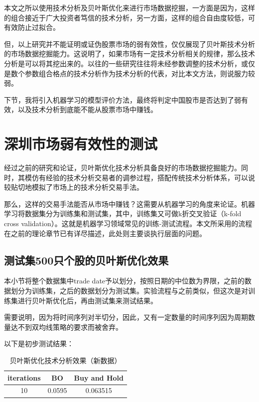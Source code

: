 \documentclass[twoside,longtitle]{LZUthesis}
\begin{document}
本文之所以使用技术分析及贝叶斯优化来进行市场数据挖掘，一方面是因为，这样的组合接近于广大投资者笃信的技术分析，另一方面，这样的组合自由度较低，可有效防止过拟合。

但，以上研究并不能证明或证伪股票市场的弱有效性，仅仅展现了贝叶斯技术分析的市场数据挖掘能力。这说明了，如果市场有一定技术分析相关的规律，那么技术分析是可以将其挖出来的。以往的一些研究往往将未经参数调整的技术分析，或仅是数个参数组合格点的技术分析作为技术分析的代表，对比本文方法，则说服力较弱。

下节，我将引入机器学习的模型评价方法，最终将判定中国股市是否达到了弱有效，以及技术分析到底能不能从股票市场中赚钱。

\section{深圳市场弱有效性的测试}
经过之前的研究和论证，贝叶斯优化技术分析具备良好的市场数据挖掘能力。同时，其模仿有经验的技术分析交易者的调参过程，搭配传统技术分析体系，可以说较贴切地模拟了市场上的技术分析交易手法。

那么，这样的交易手法能否从市场中赚钱？这需要从机器学习的角度来论证。机器学习将数据集分为训练集和测试集，其中，训练集又可做k折交叉验证（k-fold cross validation）。这就是机器学习领域常见的训练-测试流程。本文所采用的流程在之前的理论章节已有详尽描述，此处则主要谈执行层面的问题。

\subsection{测试集500只个股的贝叶斯优化效果}

本小节将整个数据集中trade date予以划分，按照日期的中位数为界限，之前的数据划分为训练集，之后的数据划分为测试集。实验流程与之前类似，但这次是对训练集进行贝叶斯优化后，再由测试集来测试结果。

需要说明，因为将时间序列对半切分，因此，又有一定数量的时间序列因为周期数量达不到双均线策略的要求而被舍弃。

以下是初步测试结果：

\begin{table}[h]
\centering
\begin{tabular}{ccc}
\hline
iterations & BO    & Buy and Hold \\\hline
10 & 0.0595& 0.063515        \\\hline
\end{tabular}
\caption{贝叶斯优化技术分析效果（新数据）}
\label{tab:my-table}
\end{table}
\end{document}
